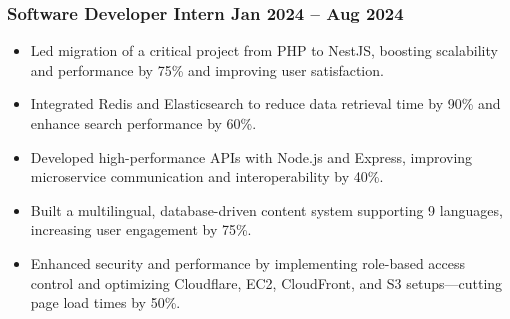 \documentclass[10pt]{article}
\newcommand{\rside}[1]{
  \hfill {\normalfont\color{accent} #1}%
}
\begin{document}
\subsubsection{Software Developer Intern \rside{Jan 2024 -- Aug 2024}}
\begin{itemize}
  \item Led migration of a critical project from PHP to NestJS, boosting scalability and performance by 75\% and improving user satisfaction.

  \item Integrated Redis and Elasticsearch to reduce data retrieval time by 90\% and enhance search performance by 60\%.

  \item Developed high-performance APIs with Node.js and Express, improving microservice communication and interoperability by 40\%.

  \item Built a multilingual, database-driven content system supporting 9 languages, increasing user engagement by 75\%.

  \item Enhanced security and performance by implementing role-based access control and optimizing Cloudflare, EC2, CloudFront, and S3 setups—cutting page load times by 50\%.
\end{itemize}
\end{document}
